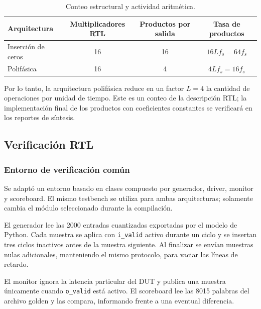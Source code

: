 \documentclass[10pt,a4paper]{article}
\begin{document}
\begin{table}[H]
    \centering
    \caption{Conteo estructural y actividad aritmética.}
    \label{tab:multiplicaciones}
    \begin{tabular}{@{}lccc@{}}
        \toprule
        \textbf{Arquitectura} & \textbf{Multiplicadores RTL} &
        \textbf{Productos por salida} & \textbf{Tasa de productos} \\
        \midrule
        Inserción de ceros & 16 & 16 & $16L f_s=64f_s$ \\
        Polifásica         & 16 & 4  & $4L f_s=16f_s$ \\
        \bottomrule
    \end{tabular}
\end{table}

Por lo tanto, la arquitectura polifásica reduce en un factor $L=4$ la cantidad de
operaciones por unidad de tiempo. Este es un conteo de la descripción RTL; la
implementación final de los productos con coeficientes constantes se verificará en
los reportes de síntesis.

\subsection{Verificación RTL}
\label{sec:verificacion-rtl}

\subsubsection*{Entorno de verificación común}

Se adaptó un entorno basado en clases compuesto por generador, driver, monitor y
scoreboard. El mismo testbench se utiliza para ambas arquitecturas; solamente cambia
el módulo seleccionado durante la compilación.

El generador lee las 2000 entradas cuantizadas exportadas por el modelo de Python.
Cada muestra se aplica con \texttt{i\_valid} activo durante un ciclo y se insertan
tres ciclos inactivos antes de la muestra siguiente. Al finalizar se envían muestras
nulas adicionales, manteniendo el mismo protocolo, para vaciar las líneas de retardo.

El monitor ignora la latencia particular del DUT y publica una muestra únicamente
cuando \texttt{o\_valid} está activo. El scoreboard lee las 8015 palabras del archivo
golden y las compara, informando frente a una eventual diferencia.
\end{document}
